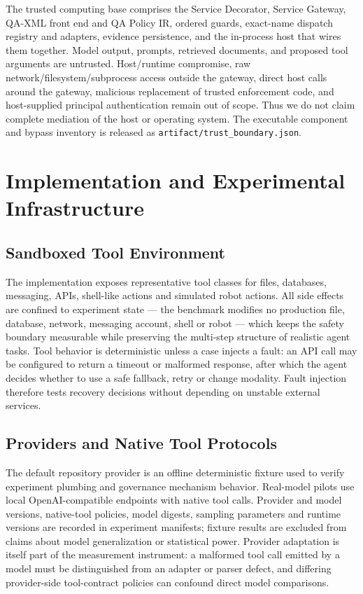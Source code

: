 \documentclass[acmsmall,screen,review,anonymous]{acmart}
\begin{document}
The trusted computing base comprises the Service Decorator, Service Gateway,
QA-XML front end and QA Policy IR, ordered guards, exact-name dispatch registry
and adapters, evidence persistence, and the in-process host that wires them
together. Model output, prompts, retrieved documents, and proposed tool arguments
are untrusted. Host/runtime compromise, raw network/filesystem/subprocess access
outside the gateway, direct host calls around the gateway, malicious replacement
of trusted enforcement code, and host-supplied principal authentication remain
out of scope. Thus we do not claim complete mediation of the host or operating
system. The executable component and bypass inventory is released as
\texttt{artifact/trust\_boundary.json}.


\section{Implementation and Experimental Infrastructure}
\label{pg:impl}

\subsection{Sandboxed Tool Environment}

The implementation exposes representative tool classes for files, databases,
messaging, APIs, shell-like actions and simulated robot actions. All side effects
are confined to experiment state --- the benchmark modifies no production file,
database, network, messaging account, shell or robot --- which keeps the safety
boundary measurable while preserving the multi-step structure of realistic agent
tasks. Tool behavior is deterministic unless a case injects a fault: an API call
may be configured to return a timeout or malformed response, after which the agent
decides whether to use a safe fallback, retry or change modality. Fault injection
therefore tests recovery decisions without depending on unstable external services.

\subsection{Providers and Native Tool Protocols}

The default repository provider is an offline deterministic fixture used to
verify experiment plumbing and governance mechanism behavior. Real-model pilots
use local OpenAI-compatible endpoints with native tool calls. Provider and model
versions, native-tool policies, model digests, sampling parameters and runtime
versions are recorded in experiment manifests; fixture results are excluded from
claims about model generalization or statistical power. Provider
adaptation is itself part of the measurement instrument: a malformed tool call
emitted by a model must be distinguished from an adapter or parser defect, and
differing provider-side tool-contract policies can confound direct model
comparisons.
\end{document}
